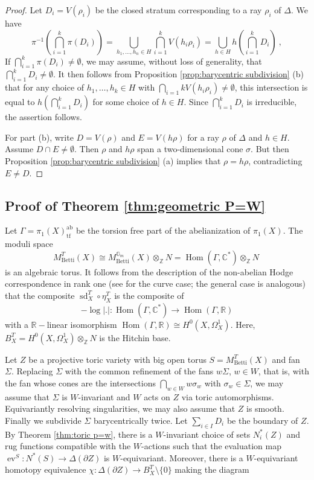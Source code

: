 \documentclass[11pt, a4paper]{amsart}
\theoremstyle{definition}
\theoremstyle{myitemstyle}
\newcommand{\R}{\mathbb{R}}
\newcommand{\Z}{\mathbb{Z}}
\newcommand{\C}{\mathbb{C}}
\newcommand{\G}{\mathbb{G}}
\DeclareMathOperator{\Hom}{Hom}
\DeclareMathOperator{\ev}{ev}
\newcommand{\ab}{\mathrm{ab}}
\newcommand{\tf}{\mathrm{tf}}
\newcommand{\Betti}{{\mathrm{Betti}}}
\newcommand{\sd}{{\operatorname{sd}}}
\begin{document}
\begin{proof}
Let $D_i=V(\rho_i)$ be the closed stratum corresponding to a ray $\rho_i$ of $\Delta$. We have
\[
    \pi^{-1}\left(\bigcap_{i=1}^k \pi(D_i)\right)
    = \bigcup_{h_1,\ldots, h_n\in H} \bigcap_{i=1}^k V(h_i\rho_i)
    = \bigcup_{h\in H} h\left(\bigcap_{i=1}^k D_i\right)\ ,
\]
If $\bigcap_{i=1}^k\pi(D_i)\neq \emptyset$, we may assume, without loss of generality, that $\bigcap_{i=1}^k D_i\neq \emptyset$. It then follows from Proposition \ref{prop:barycentric subdivision} (b) that for any choice of $h_1,\ldots,h_k\in H$ with $\bigcap_{i=1} k V(h_i\rho_i)\neq \emptyset$, this intersection is equal to $h\left(\bigcap_{i=1}^k D_i\right)$ for some choice of $h\in H$. Since $\bigcap_{i=1}^k D_i$ is irreducible, the assertion follows.

For part (b), write $D=V(\rho)$ and $E=V(h\rho)$ for a ray $\rho$ of $\Delta$ and $h\in H$. Assume $D\cap E\neq \emptyset$. Then $\rho$ and $h\rho$ span a two-dimensional cone $\sigma$. But then Proposition \ref{prop:barycentric subdivision} (a) implies that $\rho=h\rho$, contradicting $E\neq D$.
\end{proof}

\subsection{Proof of Theorem \ref{thm:geometric P=W}}

Let $\Gamma=\pi_1(X)^\ab_\tf$ be the torsion free part of the abelianization of $\pi_1(X)$. The moduli space 
\[
    M^T_\Betti(X)\cong M^{\G_m}_\Betti(X)\otimes_\Z N =\Hom(\Gamma,\C^*)\otimes_\Z N\ 
\]
is an algebraic torus. It follows from the description of the non-abelian Hodge correspondence in rank one (see \cite[p.\ 21]{Simpson_nonabelianHodge} for the curve case; the general case is analogous) that the composite $\sd^T_X\circ \eta^T_X$ is the composite of
\[
    -\log|.|\colon \Hom(\Gamma,\C^*)\to \Hom(\Gamma,\R)
\]
with a $\mathbb{R}-$linear isomorphism $\Hom(\Gamma,\R)\cong H^0(X,\Omega^1_X)$. Here, $B^T_X= H^0(X,\Omega^1_X)\otimes_\mathbb{Z}N$ is the Hitchin base.

Let $Z$ be a projective toric variety with big open torus $S=M^T_\Betti(X)$ and fan $\Sigma$. Replacing $\Sigma$ with the common refinement of the fans $w\Sigma$, $w\in W$, that is, with the fan whose cones are the intersections $\bigcap_{w\in W}w\sigma_w$ with $\sigma_w\in\Sigma$, we may assume that $\Sigma$ is $W$-invariant and $W$ acts on $Z$ via toric automorphisms. Equivariantly resolving singularities, we may also assume that $Z$ is smooth. Finally we subdivide $\Sigma$ barycentrically twice. Let $\sum_{i\in I}D_i$ be the boundary of $Z$. By Theorem \ref{thm:toric p=w}, there is a $W$-invariant choice of sets $N^*_i(Z)$ and rug functions compatible with the $W$-actions such that the evaluation map $\ev^S\colon N^*(S)\to \Delta(\partial Z)$ is $W$-equivariant. Moreover, there is a $W$-equivariant homotopy equivalence $\chi\colon \Delta(\partial Z)\to B^T_X\setminus \{0\}$ making the diagram
\end{document}
